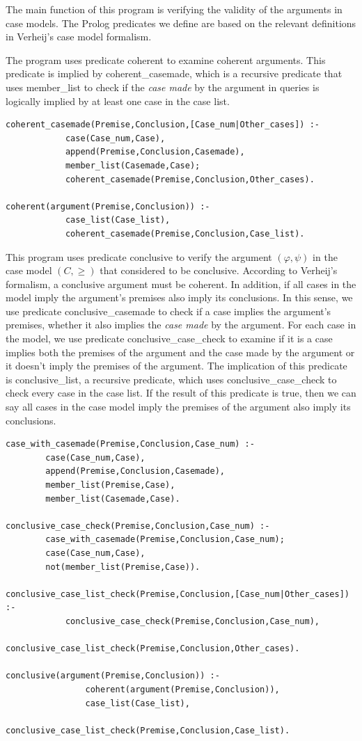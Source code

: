 \documentclass{IOS-Book-Article}
\begin{document}
The main function of this program is verifying the validity of the arguments in case models. The Prolog predicates we define are based on the relevant definitions in Verheij's case model formalism.

The program uses predicate {\mf coherent} to examine coherent arguments. This predicate is implied by {\mf coherent\_casemade}, which is a recursive predicate that uses {\mf member\_list} to check if the \textit{case made} by the argument in queries is logically implied by at least one case in the case list.
\begin{lstlisting}
coherent_casemade(Premise,Conclusion,[Case_num|Other_cases]) :-
			case(Case_num,Case),
			append(Premise,Conclusion,Casemade),
			member_list(Casemade,Case);
			coherent_casemade(Premise,Conclusion,Other_cases).

coherent(argument(Premise,Conclusion)) :-
			case_list(Case_list),
			coherent_casemade(Premise,Conclusion,Case_list).
\end{lstlisting}

This program uses predicate {\mf conclusive} to verify the argument $(\varphi, \psi)$ in the case model $(C, \geq)$ that considered to be conclusive. According to Verheij's formalism, a conclusive argument must be coherent. In addition, if all cases in the model imply the argument's premises also imply its conclusions. In this sense, we use predicate {\mf conclusive\_casemade} to check if a case implies the argument's premises, whether it also implies the \textit{case made} by the argument. For each case in the model, we use predicate {\mf conclusive\_case\_check} to examine if it is a case implies both the premises of the argument and the case made by the argument or it doesn't imply the premises of the argument.
The implication of this predicate is {\mf conclusive\_list}, a recursive predicate, which uses {\mf conclusive\_case\_check} to check every case in the case list. If the result of this predicate is {\mf true}, then we can say all cases in the case model imply the premises of the argument also imply its conclusions.
\begin{lstlisting}
case_with_casemade(Premise,Conclusion,Case_num) :-
		case(Case_num,Case),
		append(Premise,Conclusion,Casemade),
		member_list(Premise,Case),
		member_list(Casemade,Case).

conclusive_case_check(Premise,Conclusion,Case_num) :-
		case_with_casemade(Premise,Conclusion,Case_num);
		case(Case_num,Case),
		not(member_list(Premise,Case)).

conclusive_case_list_check(Premise,Conclusion,[Case_num|Other_cases]) :-
			conclusive_case_check(Premise,Conclusion,Case_num),
			conclusive_case_list_check(Premise,Conclusion,Other_cases).

conclusive(argument(Premise,Conclusion)) :-
				coherent(argument(Premise,Conclusion)),
				case_list(Case_list),
				conclusive_case_list_check(Premise,Conclusion,Case_list).
\end{lstlisting}
\end{document}
